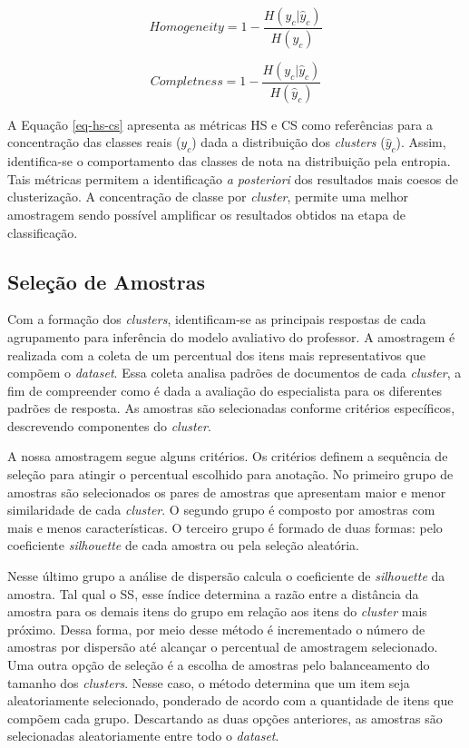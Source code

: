 \begin{equation}
Homogeneity = 1 - \frac{H(y_{c} | \hat{y}_{c})}{H(y_{c})}
\label{eq-hs-cs}
\end{equation}

\begin{equation*}
Completness = 1 - \frac{H(y_{c} | \hat{y}_{c})}{H(\hat{y}_{c})}
\end{equation*}

A Equação \ref{eq-hs-cs} apresenta as métricas HS e CS como referências para a concentração das classes reais ($y_{c}$) dada a distribuição dos \textit{clusters} ($\hat{y}_{c}$). Assim, identifica-se o comportamento das classes de nota na distribuição pela entropia. Tais métricas permitem a identificação \textit{a posteriori} dos resultados mais coesos de clusterização. A concentração de classe por \textit{cluster}, permite uma melhor amostragem sendo possível amplificar os resultados obtidos na etapa de classificação.


\subsection{Seleção de Amostras}
\label{subsec-selecao-amostras}

Com a formação dos \textit{clusters}, identificam-se as principais respostas de cada agrupamento para inferência do modelo avaliativo do professor. A amostragem é realizada com a coleta de um percentual dos itens mais representativos que compõem o \textit{dataset}. Essa coleta analisa padrões de documentos de cada \textit{cluster}, a fim de compreender como é dada a avaliação do especialista para os diferentes padrões de resposta. As amostras são selecionadas conforme critérios específicos, descrevendo componentes do \textit{cluster}. 

A nossa amostragem segue alguns critérios. Os critérios definem a sequência de seleção para atingir o percentual escolhido para anotação. No primeiro grupo de amostras são selecionados os pares de amostras que apresentam maior e menor similaridade de cada \textit{cluster}. O segundo grupo é composto por amostras com mais e menos características. O terceiro grupo é formado de duas formas: pelo coeficiente \textit{silhouette} \cite{rousseeuw1987} de cada amostra ou pela seleção aleatória.

Nesse último grupo a análise de dispersão calcula o coeficiente de \textit{silhouette} da amostra. Tal qual o SS, esse índice determina a razão entre a distância da amostra para os demais itens do grupo em relação aos itens do \textit{cluster} mais próximo. Dessa forma, por meio desse método é incrementado o número de amostras por dispersão até alcançar o percentual de amostragem selecionado. Uma outra opção de seleção é a escolha de amostras pelo balanceamento do tamanho dos \textit{clusters}. Nesse caso, o método determina que um item seja aleatoriamente selecionado, ponderado de acordo com a quantidade de itens que compõem cada grupo. Descartando as duas opções anteriores, as amostras são selecionadas aleatoriamente entre todo o \textit{dataset}.

